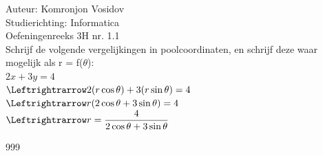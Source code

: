 \documentclass[a4paper]{article}
\begin{document}
	
	\noindent \large Auteur: Komronjon Vosidov \\
	\noindent \large Studierichting: Informatica\\
	\noindent \large Oefeningenreeks 3H nr. 1.1\\
	
	
	
	\normalsize
	Schrijf de volgende vergelijkingen in poolcoordinaten, en schrijf deze waar mogelijk als r = f($\theta$):\\
	
	$2x+3y=4$\\
	
	$\Leftrightrarrow 2(r\cos\theta) + 3(r\sin\theta) = 4$\\

	$\Leftrightrarrow r(2\cos\theta + 3\sin\theta) = 4$\\
	
	$\Leftrightrarrow r = \dfrac{4}{2\cos\theta + 3\sin\theta}$
	

	
	
	
	
	
\begin{thebibliography}{999}
\end{thebibliography}		
\end{document}
